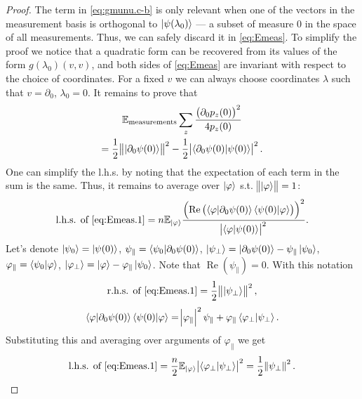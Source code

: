 \documentclass[american,aps,pra,reprint,floatfix,nofootinbib,superscriptaddress]{revtex4-2}
\DeclareMathOperator{\real}{Re}
\begin{document}
\begin{proof}
  The term in \cref{eq:gmunu.c-b} is only relevant when one of the
  vectors in the measurement basis is orthogonal to $\ket{\psi(\lambda_0)}$
  --- a subset of measure $0$ in the space of all measurements. Thus, we can
  safely discard it in \cref{eq:Emeas}. To simplify the proof we notice that
  a quadratic form can be recovered from its values of the form
  $g(\lambda_0)(v, v)$,
  and both sides of \cref{eq:Emeas} are
  invariant with respect to the choice of coordinates.
  For a fixed $v$ we can always choose coordinates $\lambda$
  such that $v = \partial_0$, $\lambda_0 = 0$. It remains to prove that
  \begin{multline}
    \label{eq:Emeas.1}
    \mathbb{E}_{\textrm{measurements}}
    \sum_{z}
        \frac{
          \left(\partial_{0} p_z(0)\right)^2
        }{4 p_z(0)} \\
    = \frac12 \norm{\ket{\partial_{0} \psi(0)}}^2
        - \frac12 \abs{\braket{\partial_{0} \psi(0) | \psi(0)}}^2.
  \end{multline}
  One can simplify the l.h.s. by noting that the expectation of each term
  in the sum is the same. Thus, it remains to average over $\ket{\varphi}$
  s.t. $\norm{\ket{\varphi}} = 1$:
  \begin{multline}
    \textrm{l.h.s. of \eqref{eq:Emeas.1}}
    = n\mathbb{E}_{\ket{\varphi}}
      \frac{
        \left(\real\left(
        \braket{\varphi|\partial_{0} \psi(0)}
        \braket{\psi(0)|\varphi}\right)\right)^2
      }{\abs{\braket{\varphi|\psi(0)}}^2}.
  \end{multline}
  Let's denote
    $\ket{\psi_0} = \ket{\psi(0)}$,
    $\psi_\parallel = \braket{\psi_0|\partial_0\psi(0)}$,
    $\ket{\psi_\perp} = \ket{\partial_0\psi(0)} - \psi_\parallel\ket{\psi_0}$,
    $\varphi_\parallel = \braket{\psi_0|\varphi}$,
    $\ket{\varphi_\perp} = \ket{\varphi} - \varphi_\parallel\ket{\psi_0}$.
    Note that $\real(\psi_\parallel) = 0$.  With this notation
  \begin{equation}
    \textrm{r.h.s. of \eqref{eq:Emeas.1}} = \frac12 \norm{\ket{\psi_\perp}}^2,
  \end{equation}
  \begin{equation}
    \braket{\varphi|\partial_{0} \psi(0)} \braket{\psi(0)|\varphi} = 
    \abs{\varphi_\parallel}^2 \psi_\parallel
    + \varphi_\parallel \braket{\varphi_\perp|\psi_\perp}.
  \end{equation}
  Substituting this and averaging over arguments of $\varphi_\parallel$
  we get
  \begin{equation}
    \textrm{l.h.s. of \eqref{eq:Emeas.1}}
    = \frac{n}{2}\mathbb{E}_{\ket{\varphi}}
      \abs{\braket{\varphi_\perp|\psi_\perp}}^2
    = \frac12 \norm{\psi_\perp}^2.
  \end{equation}
\end{proof}
\end{document}
